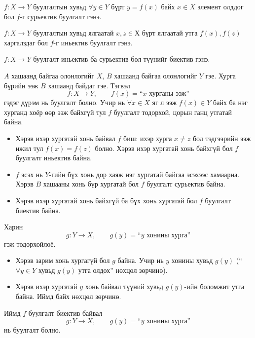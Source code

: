 \begin{definition}[Сурьектив]
$f:X\to Y$ буулгалтын хувьд $\forall y\in Y$ бүрт $y=f(x)$ байх $x\in X$ элемент олддог бол $f$-г сурьектив буулгалт гэнэ. 
\end{definition}

\begin{definition}[Иньектив]
$f:X\to Y$ буулгалтын хувьд ялгаатай $x , z \in Х$ бүрт ялгаатай утга $f(x) , f(z)$ харгалздаг бол $f$-г иньектив буулгалт гэнэ. 
\end{definition}
\begin{definition}[Биектив]
$f:X\to Y$ буулгалт иньектив ба сурьектив бол түүнийг биектив гэнэ. 
\end{definition}
\begin{example} $A$ хашаанд байгаа  олонлогийг $X$, $B$  хашаанд байгаа  олонлогийг $Y$ гэе. Хурга бүрийн ээж $B$ хашаанд байдаг гэе. Тэгвэл
\[
f:X\to Y,\qquad f(x)=\text{``$x$ хурганы ээж''}
\]
гэдэг дүрэм нь буулгалт болно. Учир нь $\forall x\in X$ яг  л ээж $f(x)\in Y$ байх ба  нэг хурганд хоёр өөр ээж байхгүй тул $f$  буулгалт тодорхой, цорын ганц утгатай байна.

\begin{itemize}
  \item Хэрэв ихэр хургатай хонь байвал $f$  биш: ихэр хурга $x\neq z$ бол тэдгээрийн ээж ижил тул $f(x)=f(z)$ болно. Хэрэв ихэр хургатай хонь байхгүй бол $f$ буулгалт иньектив байна.
  \item $f$  эсэх нь $Y$-гийн бүх хонь дор хаяж нэг хургатай байгаа эсэхээс хамаарна. Хэрэв $B$ хашааны хонь бүр хургатай бол $f$ буулгалт сурьектив байна.
  \item Хэрэв ихэр хургатай хонь байхгүй ба бүх хонь хургатай бол $f$ буулгалт биектив байна.
\end{itemize}

Харин
\[
g:Y\to X,\qquad g(y)=\text{``$y$ хонины хурга''}
\]
гэж тодорхойлоё. 
\begin{itemize}
  \item Хэрэв зарим хонь хургагүй бол $g$  байна. Учир нь $y$ хонины хувьд $g(y)$  (``\,$\forall y\in Y$ хувьд $g(y)$ утга олдох'' нөхцөл зөрчинө).
  \item Хэрэв ихэр хургатай $y$ хонь байвал түүний хувьд $g(y)$-ийн  боломжит утга байна. Иймд  байх нөхцөл зөрчинө.
\end{itemize}
Иймд $f$ буулгалт биектив байвал 
\[
g:Y\to X,\qquad g(y)=\text{``$y$ хонины хурга''}
\]  нь буулгалт болно.
\end{example}

